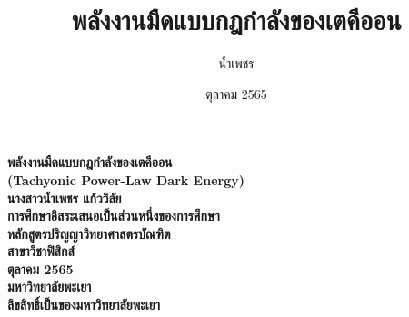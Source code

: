 \documentclass[a4paper,12pt]{upthesis}
\title{  						%
พลังงานมืดแบบกฎกำลังของเตคีออน
}
\author{น้ำเพชร}{แก้ววิลัย}
\date{ตุลาคม 2565}                                               %
\begin{document}

\thispagestyle{empty}
\begin{center} %
\Large{\textbf{พลังงานมืดแบบกฎกำลังของเตคีออน\\
(Tachyonic Power-Law Dark Energy)\\}}
\vspace{7cm}
\textbf{นางสาวน้ำเพชร แก้ววิลัย\\} %
\vspace{7cm}
\textbf{การศึกษาอิสระเสนอเป็นส่วนหนึ่งของการศึกษา\\
หลักสูตรปริญญาวิทยาศาสตรบัณฑิต\\
สาขาวิชาฟิสิกส์\\
ตุลาคม 2565\\
มหาวิทยาลัยพะเยา\\
ลิขสิทธิ์เป็นของมหาวิทยาลัยพะเยา}
\end{center}



\newpage
\setcounter{page}{1}
\thispagestyle{empty}
\end{document}
